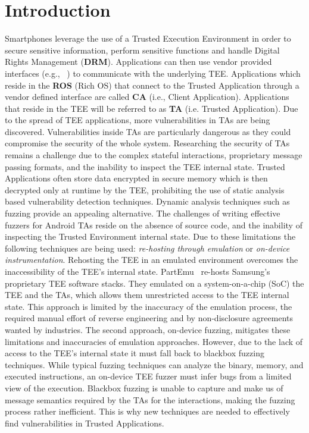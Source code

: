 \documentclass[a4paper,11pt,oneside]{article}
\begin{document}
\section{Introduction}
Smartphones leverage the use of a Trusted Execution Environment in order to secure sensitive information, perform sensitive functions and handle Digital Rights Management (\textbf{DRM}). Applications can then use vendor provided interfaces (e.g., ~\cite{HuaweiTrustedCore}) to communicate with the underlying TEE. Applications which reside in the \textbf{ROS} (Rich OS) that connect to the Trusted Application through a vendor defined interface are called \textbf{CA} (i.e., Client Application). Applications that reside in the TEE will be referred to as \textbf{TA} (i.e. Trusted Application). Due to the spread of TEE applications, more vulnerabilities in TAs are being discovered. Vulnerabilities inside TAs are particularly dangerous as they could compromise the security of the whole system. Researching the security of TAs remains a challenge due to the complex stateful interactions, proprietary message passing formats, and the inability to inspect the TEE internal state.
Trusted Applications often store data encrypted in secure memory which is then decrypted only at runtime by the TEE, prohibiting the use of static analysis based vulnerability detection techniques. Dynamic analysis techniques such as fuzzing provide an appealing alternative. The challenges of writing effective fuzzers for Android TAs reside on the absence of source code, and the inability of inspecting the Trusted Environment internal state. Due to these limitations the following techniques are being used: \emph{re-hosting through emulation} or \emph{on-device instrumentation}.
Rehosting the TEE in an emulated environment overcomes
the inaccessibility of the TEE’s internal state. PartEmu~\cite{Harrison2020PARTEMUED} re-hosts Samsung’s proprietary TEE software stacks.
They emulated on a system-on-a-chip (SoC) the TEE and the TAs, which allows them unrestricted access to the TEE internal state.
This approach is limited by the inaccuracy of the emulation process, the required manual effort of reverse engineering and by non-disclosure agreements wanted by industries.
The second approach, on-device fuzzing, mitigates these
limitations and inaccuracies of emulation approaches. However, due to the lack of access to the TEE’s internal state it must fall
back to blackbox fuzzing techniques. While typical fuzzing techniques can analyze the binary, memory, and
executed instructions, an on-device TEE fuzzer must infer bugs from a limited view of the execution.
Blackbox fuzzing is unable to capture and make us of
message semantics required by the TAs for the interactions, making the fuzzing process rather inefficient. This is why new techniques are needed to effectively find vulnerabilities in Trusted Applications.
\end{document}
